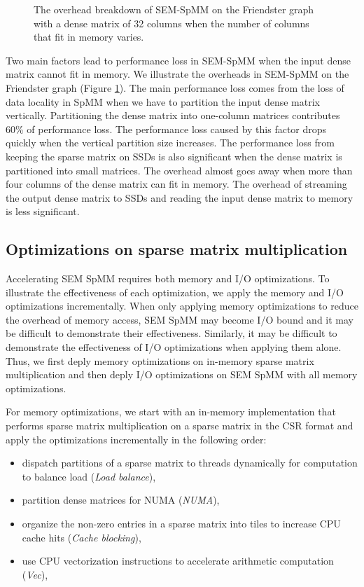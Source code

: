 \begin{figure}
	\begin{center}
		\footnotesize
		
		\caption{The overhead breakdown of SEM-SpMM on the Friendster
			graph with a dense matrix of 32 columns when the number
			of columns that fit in memory varies. }
		\label{perf:spmm32_over}
	\end{center}
\end{figure}

Two main factors lead to performance loss in SEM-SpMM when the input dense matrix
cannot fit in memory. We illustrate the overheads in SEM-SpMM on the Friendster
graph (Figure \ref{perf:spmm32_over}). The main performance loss
comes from the loss of data locality in SpMM when we have to partition the input
dense matrix vertically.
Partitioning the dense matrix into one-column matrices contributes 60\%
of performance loss. The performance loss caused by this factor drops quickly
when the vertical partition size increases. The performance loss from keeping
the sparse matrix on SSDs is also significant when the dense matrix is partitioned
into small matrices. The overhead almost goes away when more than four columns
of the dense matrix can fit in memory. The overhead of streaming the output dense
matrix to SSDs and reading the input dense matrix to memory is less significant.

\subsection{Optimizations on sparse matrix multiplication}
Accelerating SEM SpMM requires both memory and I/O optimizations. To illustrate
the effectiveness of each optimization, we apply the memory and I/O optimizations
incrementally. When only applying memory optimizations to reduce the overhead
of memory access, SEM SpMM may become I/O bound and it may be difficult to
demonstrate their effectiveness. Similarly, it may be difficult to demonstrate
the effectiveness of I/O optimizations when applying them alone. Thus, we first
deply memory optimizations on in-memory sparse matrix multiplication and then
deply I/O optimizations on SEM SpMM with all memory optimizations.

For memory optimizations, we start with an in-memory implementation that
performs sparse matrix multiplication on a sparse matrix in the CSR format
and apply the optimizations incrementally in the following order:
\begin{itemize} \itemsep1pt \parskip0pt 
	\item dispatch partitions of a sparse matrix to threads dynamically for
		computation to balance load (\textit{Load balance}),
	\item partition dense matrices for NUMA (\textit{NUMA}),
	\item organize the non-zero entries in a sparse matrix into tiles to
		increase CPU cache hits (\textit{Cache blocking}),
	\item use CPU vectorization instructions to accelerate arithmetic
		computation (\textit{Vec}),
\end{itemize}


